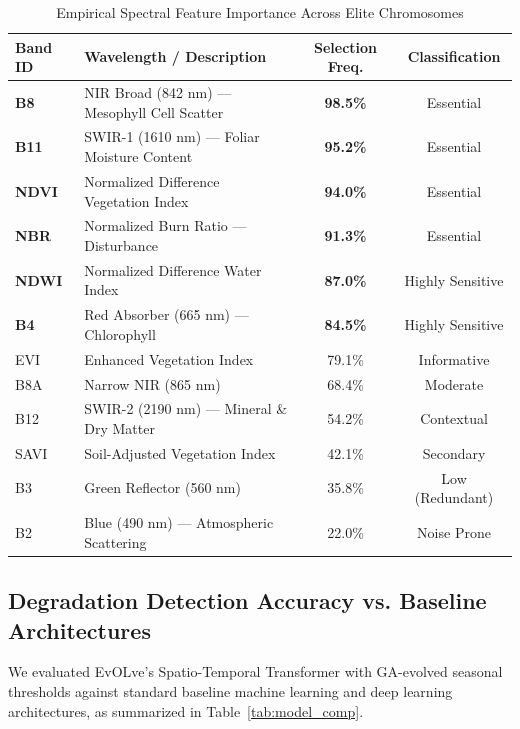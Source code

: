 \documentclass[conference]{IEEEtran}
\begin{document}
\begin{table}[htbp]
\centering
\caption{Empirical Spectral Feature Importance Across Elite Chromosomes}
\label{tab:importance}
\renewcommand{\arraystretch}{1.15}
\small
\begin{tabular}{llcc}
\toprule
\textbf{Band ID} & \textbf{Wavelength / Description} & \textbf{Selection Freq.} & \textbf{Classification} \\
\midrule
\textbf{B8} & NIR Broad (842 nm) — Mesophyll Cell Scatter & \textbf{98.5\%} & Essential \\
\textbf{B11} & SWIR-1 (1610 nm) — Foliar Moisture Content & \textbf{95.2\%} & Essential \\
\textbf{NDVI} & Normalized Difference Vegetation Index & \textbf{94.0\%} & Essential \\
\textbf{NBR} & Normalized Burn Ratio — Disturbance & \textbf{91.3\%} & Essential \\
\textbf{NDWI} & Normalized Difference Water Index & \textbf{87.0\%} & Highly Sensitive \\
\textbf{B4} & Red Absorber (665 nm) — Chlorophyll & \textbf{84.5\%} & Highly Sensitive \\
EVI & Enhanced Vegetation Index & 79.1\% & Informative \\
B8A & Narrow NIR (865 nm) & 68.4\% & Moderate \\
B12 & SWIR-2 (2190 nm) — Mineral \& Dry Matter & 54.2\% & Contextual \\
SAVI & Soil-Adjusted Vegetation Index & 42.1\% & Secondary \\
B3 & Green Reflector (560 nm) & 35.8\% & Low (Redundant) \\
B2 & Blue (490 nm) — Atmospheric Scattering & 22.0\% & Noise Prone \\
\bottomrule
\end{tabular}
\end{table}

\subsection{Degradation Detection Accuracy vs. Baseline Architectures}
We evaluated EvOLve's Spatio-Temporal Transformer with GA-evolved seasonal thresholds against standard baseline machine learning and deep learning architectures, as summarized in Table~\ref{tab:model_comp}.
\end{document}
